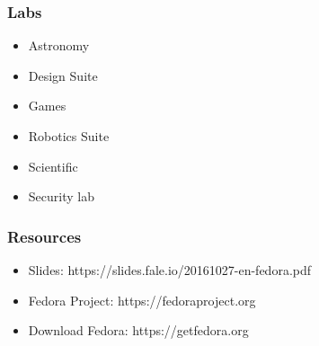 \documentclass[t,aspectratio=169]{beamer}
\begin{document}
\begin{frame}
    \frametitle{Labs}
    \begin{itemize}
        \item Astronomy
        \item Design Suite
        \item Games
        \item Robotics Suite
        \item Scientific
        \item Security lab
    \end{itemize}
\end{frame}

\begin{frame}
    \frametitle{Resources}
    \begin{itemize}
        \item Slides: https://slides.fale.io/20161027-en-fedora.pdf
        \item Fedora Project: https://fedoraproject.org
        \item Download Fedora: https://getfedora.org
    \end{itemize}
\end{frame}

\end{document}
